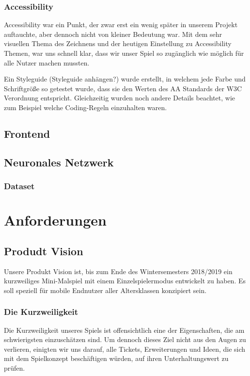 \documentclass[11pt]{article}
\begin{document}
\subsubsection{Accessibility}

Accessibility war ein Punkt, der zwar erst ein wenig später in unserem Projekt auftauchte, aber dennoch nicht von kleiner Bedeutung war. Mit dem sehr visuellen Thema des Zeichnens und der heutigen Einstellung zu Accessibility Themen, war uns schnell klar, dass wir unser Spiel so zugänglich wie möglich für alle Nutzer machen mussten.

Ein Styleguide (Styleguide anhängen?) wurde erstellt, in welchem jede Farbe und Schriftgröße so getestet wurde, dass sie den Werten des AA Standards der W3C Verordnung entspricht.
Gleichzeitig wurden noch andere Details beachtet, wie zum Beispiel welche Coding-Regeln einzuhalten waren.


\subsection{Frontend}
\subsection{Neuronales Netzwerk}
\subsubsection{Dataset}
\section{Anforderungen}
\label{chap: Anforderungen}
\subsection{Produdt Vision}
\label{sec:productVision}
Unsere Produkt Vision ist, bis zum Ende des Wintersemesters 2018/2019 ein kurzweiliges Mini-Malspiel mit einem Einzelspielermodus entwickelt zu haben. Es soll speziell für mobile Endnutzer aller Altersklassen konzipiert sein.
\subsubsection{Die Kurzweiligkeit}
Die Kurzweiligkeit unseres Spiels ist offensichtlich eine der Eigenschaften, die am schwierigsten einzuschätzen sind. Um dennoch dieses Ziel nicht aus den Augen zu verlieren, einigten wir uns darauf, alle Tickets, Erweiterungen und Ideen, die sich mit dem Spielkonzept beschäftigen würden, auf ihren Unterhaltungswert zu prüfen.
\end{document}
